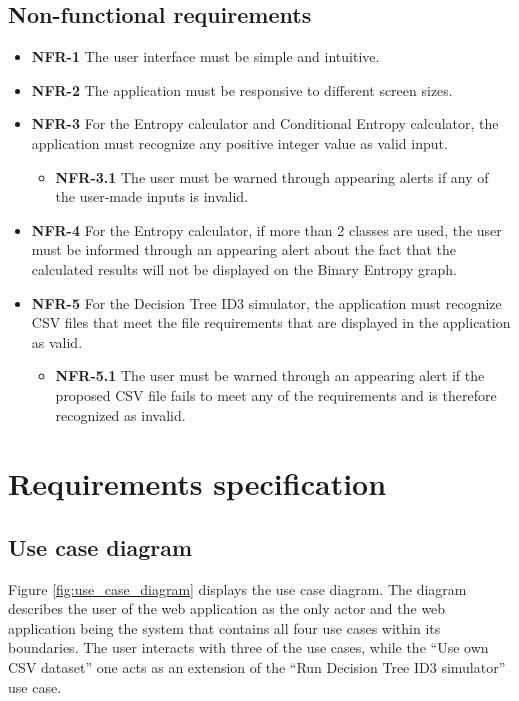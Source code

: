 \subsection{Non-functional requirements}
\begin{itemize}
    \item \textbf{NFR-1} The user interface must be simple and intuitive.
    \item \textbf{NFR-2} The application must be responsive to different screen sizes.
    \item \textbf{NFR-3} For the Entropy calculator and Conditional Entropy calculator, the application must recognize any positive integer value as valid input.
    \begin{itemize}
        \item \textbf{NFR-3.1} The user must be warned through appearing alerts if any of the user-made inputs is invalid.
    \end{itemize}
    \item \textbf{NFR-4} For the Entropy calculator, if more than 2 classes are used, the user must be informed through an appearing alert about the fact that the calculated results will not be displayed on the Binary Entropy graph.
    \item \textbf{NFR-5} For the Decision Tree ID3 simulator, the application must recognize CSV files that meet the file requirements that are displayed in the application as valid.
    \begin{itemize}
        \item \textbf{NFR-5.1} The user must be warned through an appearing alert if the proposed CSV file fails to meet any of the requirements and is therefore recognized as invalid.
    \end{itemize}
\end{itemize}

\section{Requirements specification}
\subsection{Use case diagram}
Figure \ref{fig:use_case_diagram} displays the use case diagram.
The diagram describes the user of the web application as the only actor and the web application being the system that contains all four use cases within its boundaries. The user interacts with three of the use cases, while the ``Use own CSV dataset'' one acts as an extension of the ``Run Decision Tree ID3 simulator'' use case. 


